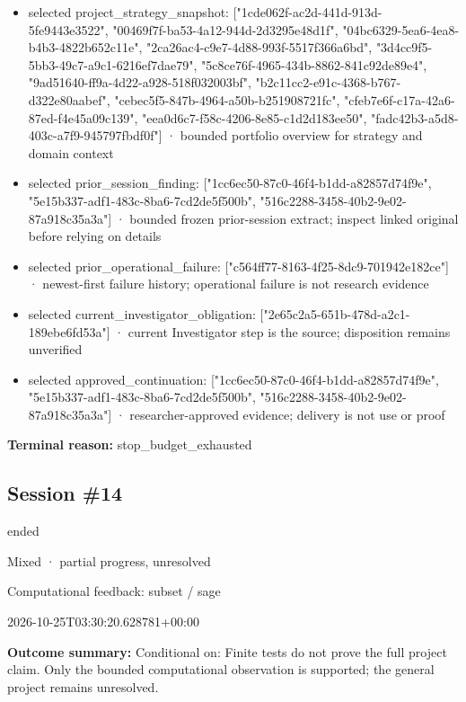\documentclass[11pt]{article}
\begin{document}
\begin{itemize}
\item selected project\_strategy\_snapshot: ["1cde062f-ac2d-441d-913d-5fe9443e3522", "00469f7f-ba53-4a12-944d-2d3295e48d1f", "04bc6329-5ea6-4ea8-b4b3-4822b652c11e", "2ca26ac4-c9e7-4d88-993f-5517f366a6bd", "3d4cc9f5-5bb3-49c7-a9c1-6216ef7dae79", "5c8ce76f-4965-434b-8862-841c92de89e4", "9ad51640-ff9a-4d22-a928-518f032003bf", "b2c11cc2-e91c-4368-b767-d322e80aabef", "cebec5f5-847b-4964-a50b-b251908721fc", "cfeb7e6f-c17a-42a6-87ed-f4e45a09c139", "eea0d6c7-f58c-4206-8e85-c1d2d183ee50", "fadc42b3-a5d8-403c-a7f9-945797fbdf0f"] · bounded portfolio overview for strategy and domain context
\item selected prior\_session\_finding: ["1cc6ec50-87c0-46f4-b1dd-a82857d74f9e", "5e15b337-adf1-483c-8ba6-7cd2de5f500b", "516c2288-3458-40b2-9e02-87a918c35a3a"] · bounded frozen prior-session extract; inspect linked original before relying on details
\item selected prior\_operational\_failure: ["c564ff77-8163-4f25-8dc9-701942e182ce"] · newest-first failure history; operational failure is not research evidence
\item selected current\_investigator\_obligation: ["2e65c2a5-651b-478d-a2c1-189ebe6fd53a"] · current Investigator step is the source; disposition remains unverified
\item selected approved\_continuation: ["1cc6ec50-87c0-46f4-b1dd-a82857d74f9e", "5e15b337-adf1-483c-8ba6-7cd2de5f500b", "516c2288-3458-40b2-9e02-87a918c35a3a"] · researcher-approved evidence; delivery is not use or proof
\end{itemize}
\textbf{Terminal reason:} stop\_budget\_exhausted\par
\subsection{Session \#14}
\begin{description}[style=nextline,font=\normalfont\bfseries,leftmargin=0pt,labelsep=0pt]
\item[Execution status] ended
\item[Outcome] Mixed · partial progress, unresolved
\item[Strategy] Computational feedback: subset / sage
\item[Started] 2026-10-25T03:30:20.628781+00:00
\end{description}
\textbf{Outcome summary:} Conditional on: Finite tests do not prove the full project claim. Only the bounded computational observation is supported; the general project remains unresolved.\par
\end{document}
